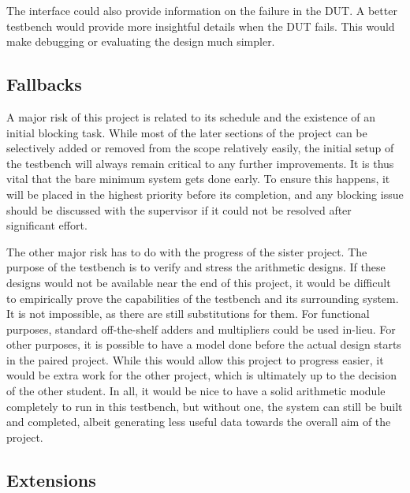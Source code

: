 The interface could also provide information on the failure in the DUT.
A better testbench would provide more insightful details when the DUT fails.
This would make debugging or evaluating the design much simpler.

\subsection{Fallbacks}
A major risk of this project is related to its schedule and the existence of an
initial blocking task.
While most of the later sections of the project can be selectively added or
removed from the scope relatively easily, the initial setup of the testbench
will always remain critical to any further improvements.
It is thus vital that the bare minimum system gets done early.
To ensure this happens, it will be placed in the highest priority before its
completion, and any blocking issue should be discussed with the supervisor if it
could not be resolved after significant effort.

The other major risk has to do with the progress of the sister project.
The purpose of the testbench is to verify and stress the arithmetic designs.
If these designs would not be available near the end of this project,
it would be difficult to empirically prove the capabilities of the testbench
and its surrounding system.
It is not impossible, as there are still substitutions for them.
For functional purposes, standard off-the-shelf adders and multipliers could be
used in-lieu.
For other purposes, it is possible to have a model done before the actual design
starts in the paired project.
While this would allow this project to progress easier, it would be extra work
for the other project, which is ultimately up to the decision of the other
student.
In all, it would be nice to have a solid arithmetic module completely to run
in this testbench, but without one, the system can still be built and completed,
albeit generating less useful data towards the overall aim of the project.

\subsection{Extensions}
